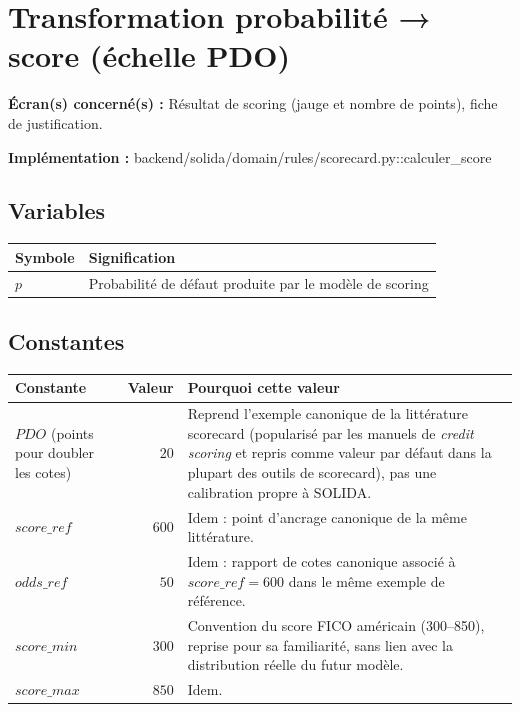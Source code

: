 \documentclass[11pt,a4paper]{article}
\newcommand{\brk}{\allowbreak}
\newcommand{\ecran}[1]{\noindent\textbf{Écran(s) concerné(s) :} #1\par}
\newcommand{\fichier}[1]{\noindent\textbf{Implémentation :} \tiny\ttfamily#1\normalfont\normalsize\par}
\begin{document}
\tableofcontents

\newpage

\section{Transformation probabilité → score (échelle PDO)}
\label{sec:scorecard}

\ecran{Résultat de scoring (jauge et nombre de points), fiche de justification.}
\fichier{backend/\brk solida/\brk domain/\brk rules/\brk scorecard.py::\brk{}calculer\_score}

\subsection*{Variables}

\begin{tabular}{@{}lL{10cm}@{}}
\toprule
Symbole & Signification \\
\midrule
$p$ & Probabilité de défaut produite par le modèle de scoring \\
\bottomrule
\end{tabular}

\subsection*{Constantes}

\begin{tabular}{@{}L{3.2cm}rL{7.4cm}@{}}
\toprule
Constante & Valeur & Pourquoi cette valeur \\
\midrule
$\mathit{PDO}$ (points pour doubler les cotes) & $20$ &
  Reprend l'exemple canonique de la littérature scorecard (popularisé par les manuels de
  \emph{credit scoring} et repris comme valeur par défaut dans la plupart des outils de
  scorecard), pas une calibration propre à SOLIDA. \\
$\mathit{score\_ref}$ & $600$ & Idem : point d'ancrage canonique de la même littérature. \\
$\mathit{odds\_ref}$ & $50$ & Idem : rapport de cotes canonique associé à $\mathit{score\_ref}=600$
  dans le même exemple de référence. \\
$\mathit{score\_min}$ & $300$ & Convention du score FICO américain (300--850), reprise pour sa
  familiarité, sans lien avec la distribution réelle du futur modèle. \\
$\mathit{score\_max}$ & $850$ & Idem. \\
\bottomrule
\end{tabular}
\end{document}
